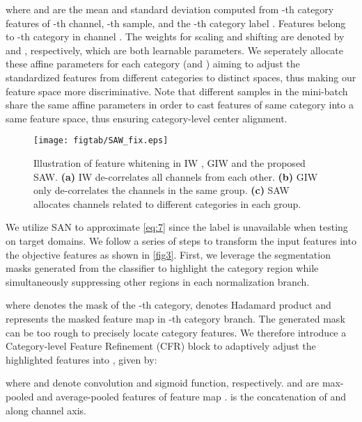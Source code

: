 \documentclass[10pt,twocolumn,letterpaper]{article}
\begin{document}
\noindent where  and  are the mean and standard deviation computed from -th category features of -th channel, -th sample, and the -th category label . Features  belong to -th category in channel . The weights for scaling and shifting are denoted by  and , respectively, which are both learnable parameters. We seperately allocate these affine parameters for each category (\ie  and ) aiming to adjust the standardized features from different categories to distinct spaces, thus making our feature space more discriminative. Note that different samples in the mini-batch share the same affine parameters in order to cast features of same category into a same feature space, thus ensuring category-level center alignment.



\begin{figure*}[t]
    \centering{}\vspace{-2mm}
     \texttt{[image: figtab/SAW\_fix.eps]} 
     \caption{Illustration of feature whitening in IW \cite{li2017universal}, GIW \cite{cho2019image} and the proposed SAW. \textbf{(a)} IW de-correlates all channels from each other. \textbf{(b)} GIW only de-correlates the channels in the same group. \textbf{(c)} SAW allocates channels related to different categories in each group.
     }
    \label{fig4}\vspace{-4mm}
    
    \end{figure*}


We utilize SAN to approximate \cref{eq:7} since the label  is unavailable when testing on target domains. We follow a series of steps to transform the input features  into the objective features  as shown in \cref{fig3}. First, we leverage the segmentation masks generated from the classifier to highlight the category region while simultaneously suppressing other regions in each normalization branch. 
\vspace{-0.8mm}

where  denotes the mask of the -th category,  denotes Hadamard product and  represents the masked feature map in -th category branch. The generated mask can be too rough to precisely locate category features. We therefore introduce a Category-level Feature Refinement (CFR) block to adaptively adjust the highlighted features  into , given by:

where  and  denote  convolution and sigmoid function, respectively.   and  are max-pooled and average-pooled features of feature map .  is the concatenation of  and  along channel axis.
\end{document}
